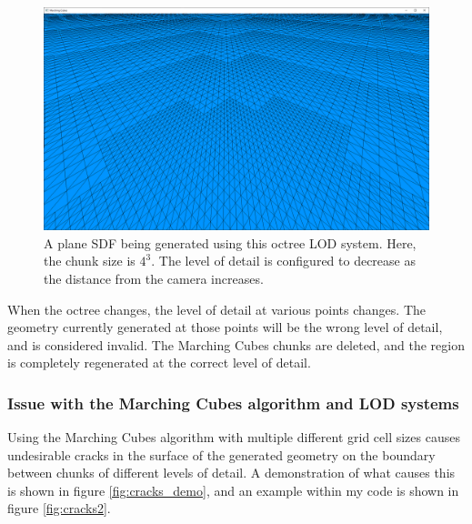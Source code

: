 \documentclass{article}
\begin{document}
\begin{figure}[H]
  \includegraphics[width=\textwidth]{octree_plane.png}
  \caption{A plane SDF being generated using this octree LOD system. Here, the chunk size is $4^3$. The level of detail is configured to decrease as the distance from the camera increases.}
\end{figure}

When the octree changes, the level of detail at various points changes. The geometry currently generated at those points will be the wrong level of detail, and is considered invalid. The Marching Cubes chunks are deleted, and the region is completely regenerated at the correct level of detail.

\subsubsection{Issue with the Marching Cubes algorithm and LOD systems}
\label{section:cracks}
Using the Marching Cubes algorithm with multiple different grid cell sizes causes undesirable cracks in the surface of the generated geometry on the boundary between chunks of different levels of detail. A demonstration of what causes this is shown in figure \ref{fig:cracks_demo}, and an example within my code is shown in figure \ref{fig:cracks2}.
\end{document}
